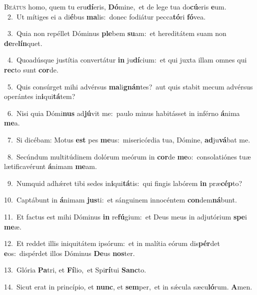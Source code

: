 \lettrine{\initial\textcolor{\initialcolor}{B}}{eátus} homo, quem tu eru\-\textbf{dí}\-eris, \textbf{Dó}\-mine,~\star et de lege tua do\-\textbf{cú}\-eris \textbf{e}\-um.\\
{\numbfont\textcolor{\numbcolor}{~2.}}~Ut mítiges ei a di\-\textbf{é}\-bus \textbf{ma}\-lis:~\star donec fodiátur pecca\-\textbf{tó}\-ri \textbf{fó}\-vea.\par
{\numbfont\textcolor{\numbcolor}{~3.}}~Quia non repéllet Dóminus \textbf{ple}\-bem \textbf{su}\-am:~\star et hereditátem suam non \textbf{de}\-re\-\textbf{lín}\-quet.\par
{\numbfont\textcolor{\numbcolor}{~4.}}~Quoadúsque justítia convertátur \textbf{in} ju\-\textbf{dí}\-cium:~\star et qui juxta illam omnes qui \textbf{rec}\-to sunt \textbf{cor}\-de.\par
{\numbfont\textcolor{\numbcolor}{~5.}}~Quis consúrget mihi advérsus \textbf{ma}\-li\-\textbf{gnán}\-tes?~\star aut quis stabit mecum advérsus operántes in\-\textbf{i}\-qui\-\textbf{tá}\-tem?\par
{\numbfont\textcolor{\numbcolor}{~6.}}~Nisi quia Dómi\textbf{nus} ad\-\textbf{jú}\-vit me:~\star paulo minus habitásset in inférno \textbf{á}\-nima \textbf{me}\-a.\par
{\numbfont\textcolor{\numbcolor}{~7.}}~Si dicébam: Motus \textbf{est} pes \textbf{me}\-us:~\star misericórdia tua, Dómine, \textbf{ad}\-ju\-\textbf{vá}\-bat me.\par
{\numbfont\textcolor{\numbcolor}{~8.}}~Secúndum multitúdinem dolórum meórum in \textbf{cor}\-de \textbf{me}\-o:~\star consolatiónes tuæ lætificavérunt \textbf{á}\-nimam \textbf{me}\-am.\par
{\numbfont\textcolor{\numbcolor}{~9.}}~Numquid adhǽret tibi sedes in\-\textbf{i}\-qui\-\textbf{tá}\-tis:~\star qui fingis labórem \textbf{in} præ\-\textbf{cép}\-to?\par
{\numbfont\textcolor{\numbcolor}{10.}}~Captábunt in \textbf{á}\-nimam \textbf{jus}\-ti:~\star et sánguinem innocéntem \textbf{con}\-dem\-\textbf{ná}\-bunt.\par
{\numbfont\textcolor{\numbcolor}{11.}}~Et factus est mihi Dóminus \textbf{in} re\-\textbf{fú}\-gium:~\star et Deus meus in adjutórium \textbf{spe}\-i \textbf{me}\-æ.\par
{\numbfont\textcolor{\numbcolor}{12.}}~Et reddet illis iniquitátem ipsórum:~\dagger et in malítia eórum dis\-\textbf{pér}\-det \textbf{e}\-os:~\star dispérdet illos Dóminus \textbf{De}\-us \textbf{nos}\-ter.\par
{\numbfont\textcolor{\numbcolor}{13.}}~Glória \textbf{Pa}\-tri, et \textbf{Fí}\-lio,~\star et Spi\-\textbf{rí}\-tui \textbf{Sanc}\-to.\par
{\numbfont\textcolor{\numbcolor}{14.}}~Sicut erat in princípio, et \textbf{nunc}\-, et \textbf{sem}\-per,~\star et in sǽcula sæcu\-\textbf{ló}\-rum. \textbf{A}\-men.\par
